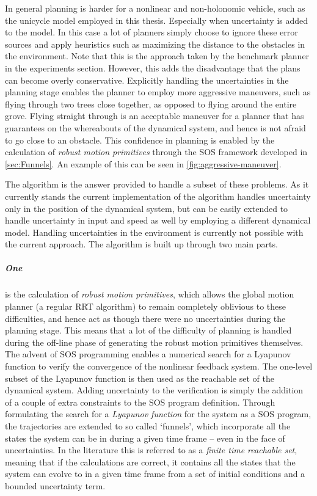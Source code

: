 In general planning is harder for a nonlinear and non-holonomic vehicle, such as
the unicycle model employed in this thesis. Especially when uncertainty is added
to the model. In this case a lot of planners simply choose to ignore these error
sources and apply heuristics such as maximizing the distance to the obstacles in
the environment. Note that this is the approach taken by the benchmark planner
in the experiments section. However, this adds the disadvantage that the plans
can become overly conservative. Explicitly handling the uncertainties in the
planning stage enables the planner to employ more aggressive maneuvers, such as
flying through two trees close together, as opposed to flying around the entire
grove. Flying straight through is an acceptable maneuver for a planner that has
guarantees on the whereabouts of the dynamical system, and hence is not afraid
to go close to an obstacle. This confidence in planning is enabled by the
calculation of \textit{robust motion primitives} through the \ac{SOS} framework
developed in \cref{sec:Funnels}. An example of this can be seen in
\cref{fig:aggressive-maneuver}.


The \rrtfunnel{} algorithm is the answer provided to handle a subset of these
problems. As it currently stands the current implementation of the algorithm
handles uncertainty only in the position of the dynamical system, but can be
easily extended to handle uncertainty in input and speed as well by employing a
different dynamical model. Handling uncertainties in the environment is
currently not possible with the current approach. The algorithm is built up
through two main parts.

\subparagraph{One} is the calculation of \textit{robust motion primitives},
which allows the global motion planner (a regular \ac{RRT} algorithm) to remain
completely oblivious to these difficulties, and hence act as though there were
no uncertainties during the planning stage. This means that a lot of the
difficulty of planning is handled during the off-line phase of generating the
robust motion primitives themselves. The advent of \ac{SOS} programming enables
a numerical search for a Lyapunov function to verify the convergence of the
nonlinear feedback system. The one-level subset of the Lyapunov function is then
used as the reachable set of the dynamical system. Adding uncertainty to the
verification is simply the addition of a couple of extra constraints to the
\ac{SOS} program definition. Through formulating the search for a
\textit{Lyapunov function} for the system as a \ac{SOS} program, the
trajectories are extended to so called `funnels', which incorporate all the
states the system can be in during a given time frame -- even in the face of
uncertainties. In the literature this is referred to as a \textit{finite time
  reachable set}, meaning that if the calculations are correct, it contains all
the states that the system can evolve to in a given time frame from a set of
initial conditions and a bounded uncertainty term.


